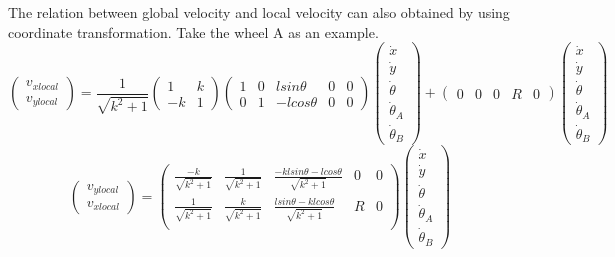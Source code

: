 \documentclass[12 pt]{article}
\begin{document}
The relation between global velocity and local velocity can also obtained by using coordinate transformation.
Take the wheel A as an example.
\begin{equation}
\begin{pmatrix}
v_{xlocal}\\
v_{ylocal}
\end{pmatrix}=
\frac{1}{\sqrt{k^2+1}}\begin{pmatrix}
1 & k\\
-k & 1 
\end{pmatrix}
\begin{pmatrix}
1& 0 & lsin\theta & 0 & 0\\
0 & 1 & -lcos\theta & 0& 0
\end{pmatrix}
\begin{pmatrix}
\dot{x}\\ \dot{y}\\ \dot{\theta} \\ \dot{\theta}_A \\ \dot{\theta}_B
\end{pmatrix}+
\begin{pmatrix}
0 & 0 & 0 & R & 0
\end{pmatrix}
\begin{pmatrix}
\dot{x}\\ \dot{y}\\ \dot{\theta} \\ \dot{\theta}_A \\ \dot{\theta}_B
\end{pmatrix}
\end{equation}
\begin{equation}
\begin{pmatrix}
v_{ylocal}\\
v_{xlocal}
\end{pmatrix}=
\begin{pmatrix}
\frac{-k}{\sqrt{k^2+1}} & \frac{1}{\sqrt{k^2+1}} & \frac{-klsin\theta-lcos\theta}{\sqrt{k^2+1}} & 0 & 0\\
\frac{1}{\sqrt{k^2+1}} & \frac{k}{\sqrt{k^2+1}} & \frac{lsin\theta-klcos\theta}{\sqrt{k^2+1}} & R & 0\\
\end{pmatrix}
\begin{pmatrix}
\dot{x}\\ \dot{y}\\ \dot{\theta} \\ \dot{\theta}_A \\ \dot{\theta}_B
\end{pmatrix}
\end{equation}
\end{document}
